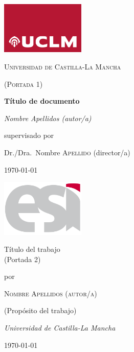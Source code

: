 \documentclass[12pt,a4paper]{report}
\begin{document}

\begin{titlepage}
	\centering
	\includegraphics[width=4cm]{uclm_logo}\par\vspace{1cm}
	{\scshape\LARGE Universidad de Castilla-La Mancha \par}
	\vspace{1cm}
	{\scshape\Large(Portada 1)\par} %
	\vspace{1.5cm}
	{\huge\bfseries Título de documento\par} %
	\vspace{2cm}
	{\Large\itshape Nombre Apellidos (autor/a)\par} %
	\vfill
	supervisado por\par
	Dr./Dra.~Nombre \textsc{Apellido} (director/a)
	\vfill %
	{\large \today \par}
\end{titlepage}
\restoregeometry

\begin{titlepage}
	\begin{addmargin}[4cm]{-1cm} %
		\centering
		\hfill\includegraphics[width=4cm]{esi_logo}\par
		\vspace{4\baselineskip}
		{\Huge 
		Título del trabajo\\ 
        (Portada 2)\par}
		\vspace{4\baselineskip}
		por\par\vspace{\baselineskip}
		{\Large\textsc{Nombre Apellidos (autor/a)}\par}
		\vfill  %
		(Propósito del trabajo)\par
		{\itshape Universidad de Castilla-La Mancha\par
        \today}
	\end{addmargin}
\end{titlepage}
\end{document}
